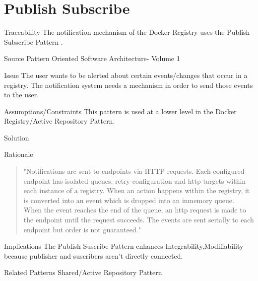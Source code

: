 \section{Publish Subscribe}
\begin{patdescription}

\item[Traceability]
The notification mechanism of the Docker Registry uses the Publish Subscribe Pattern \cite{docknotif}.

\item[Source]
Pattern Oriented Software Architecture- Volume 1

\item[Issue] The user wants to be alerted about certain events/changes that occur in a registry.
The notification system needs a mechanism in order to send those events to the user.

\item[Assumptions/Constraints] 
This pattern is used at a lower level in the Docker Registry/Active Repository Pattern.



\item[Solution]

\item[Rationale] 


\begin{quote}
"Notifications are sent to endpoints via HTTP requests. Each configured endpoint has isolated queues, retry configuration and http targets within each instance of a registry. When an action happens within the registry, it is converted into an event which is dropped into an inmemory queue. When the event reaches the end of the queue, an http request is made to the endpoint until the request succeeds. The events are sent serially to each endpoint but order is not guaranteed."%
\end{quote} 

\item[Implications] %
The Publish Suscribe Pattern enhances Integrability,Modifiability because publisher and suscribers aren't directly connected.%

\item [Related Patterns]
Shared/Active Repository Pattern


\end{patdescription}

